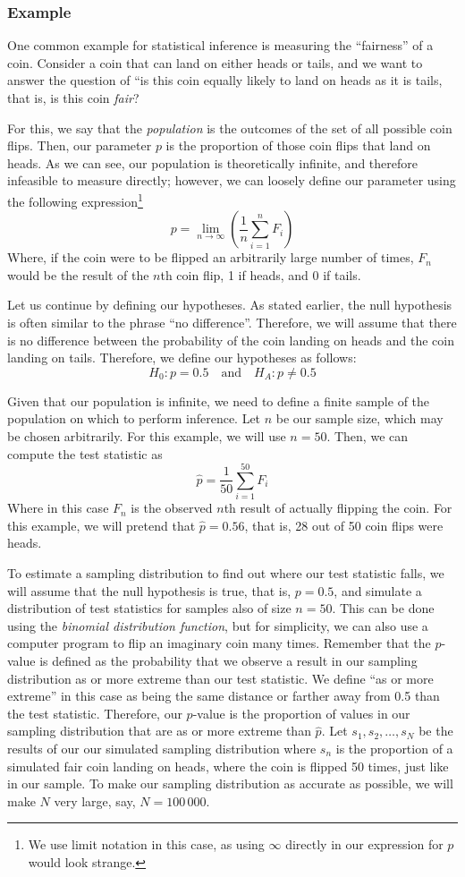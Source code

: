 \documentclass[10pt]{article}
\newcommand{\spacer}[0]{\par\vspace{0.1in}}
\begin{document}
\subsubsection{Example}
One common example for statistical inference is measuring the ``fairness'' of a coin. Consider a coin that can land on either heads or tails, and we want to answer the question of ``is this coin equally likely to land on heads as it is tails, that is, is this coin \textit{fair}?
\spacer
For this, we say that the \textit{population} is the outcomes of the set of all possible coin flips. Then, our parameter $p$ is the proportion of those coin flips that land on heads.  As we can see, our population is theoretically infinite, and therefore infeasible to measure directly; however, we can loosely define our parameter using the following expression\footnote{We use limit notation in this case, as using $\infty$ directly in our expression for $p$ would look strange.}
$$
    p=\lim_{n\to\infty}\left(\frac{1}{n}\sum_{i=1}^n F_i\right)
$$
Where, if the coin were to be flipped an arbitrarily large number of times, $F_n$ would be the result of the $n$th coin flip, 1 if heads, and 0 if tails.
\spacer
Let us continue by defining our hypotheses. As stated earlier, the null hypothesis is often similar to the phrase ``no difference''. Therefore, we will assume that there is no difference between the probability of the coin landing on heads and the coin landing on tails. Therefore, we define our hypotheses as follows:
$$
    H_0:p=0.5\quad\text{and}\quad H_A:p\neq 0.5
$$
\spacer
Given that our population is infinite, we need to define a finite sample of the population on which to perform inference. Let $n$ be our sample size, which may be chosen arbitrarily. For this example, we will use $n=50$. Then, we can compute the test statistic as
$$
    \hat p= \frac{1}{50}\sum_{i=1}^{50}F_i
$$
Where in this case $F_n$ is the observed $n$th result of actually flipping the coin. For this example, we will pretend that $\hat p=0.56$, that is, 28 out of 50 coin flips were heads.
\spacer
To estimate a sampling distribution to find out where our test statistic falls, we will assume that the null hypothesis is true, that is, $p=0.5$, and simulate a distribution of test statistics for samples also of size $n=50$. This can be done using the \textit{binomial distribution function}, but for simplicity, we can also use a computer program to flip an imaginary coin many times. Remember that the $p$-value is defined as the probability that we observe a result in our sampling distribution as or more extreme than our test statistic. We define ``as or more extreme'' in this case as being the same distance or farther away from 0.5 than the test statistic. Therefore, our $p$-value is the proportion of values in our sampling distribution that are as or more extreme than $\hat p$. Let $s_1,s_2,\dots,s_N$ be the results of our our simulated sampling distribution where $s_n$ is the proportion of a simulated fair coin landing on heads, where the coin is flipped 50 times, just like in our sample. To make our sampling distribution as accurate as possible, we will make $N$ very large, say, $N=100\,000$.
\end{document}
